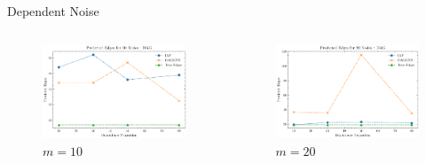 \documentclass{beamer}
\begin{document}
\begin{frame}[allowframebreaks]{Dependent Noise}
    \begin{columns}
        \begin{column}{0.5\textwidth}
            \begin{figure}
                \centering
                \includegraphics[scale=0.3]{fig/Predicted Edges_dependence_10_DAG_threshold0.3.pdf}
                \caption{$m=10$}
                \label{fig:dep_gaussian_edges_10}
            \end{figure}
        \end{column}
        \begin{column}{0.5\textwidth}
            \begin{figure}
            \centering
            \includegraphics[scale=0.3]{fig/Predicted Edges_dependence_20_DAG_threshold0.3.pdf}
            \caption{$m=20$}
            \label{fig:dep_gaussian_edges_20}
            \end{figure}
        \end{column}

\end{columns}
\end{frame}
\end{document}
